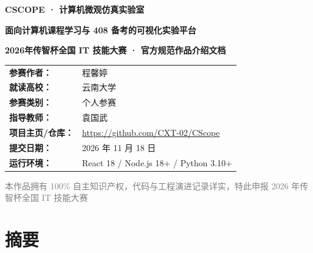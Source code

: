 \documentclass[UTF8,a4paper,11pt]{ctexart}
\begin{document}
\begin{titlepage}
    \centering
    \vspace*{1.5cm}
    
    {\Huge \bfseries CSCOPE · 计算机微观仿真实验室 \par}
    \vspace{0.6cm}
    {\LARGE \bfseries 面向计算机课程学习与 408 备考的可视化实验平台 \par}
    
    \vspace{1.5cm}
    {\Large \textbf{2026年传智杯全国 IT 技能大赛 · 官方规范作品介绍文档} \par}
    \vspace{0.4cm}
    
    \vspace{2.5cm}
    \begin{minipage}{0.75\textwidth}
        \large
        \renewcommand{\arraystretch}{1.6}
        \begin{tabular}{p{3.5cm}l}
            \textbf{参赛作者：} & 程馨婷 \\
            \textbf{就读高校：} & 云南大学 \\
            \textbf{参赛类别：} & 个人参赛 \\
            \textbf{指导教师：} & 袁国武 \\
            \textbf{项目主页/仓库：} & \url{https://github.com/CXT-02/CScope} \\
            \textbf{提交日期：} & 2026 年 11 月 18 日 \\
            \textbf{运行环境：} & React 18 / Node.js 18+ / Python 3.10+ \\
        \end{tabular}
    \end{minipage}
    
    \vfill
    {\small \textcolor{gray}{本作品拥有 100\% 自主知识产权，代码与工程演进记录详实，特此申报 2026 年传智杯全国 IT 技能大赛} \par}
    \vspace*{1cm}
\end{titlepage}

\newpage
{}
\tableofcontents
\newpage
{}
\setcounter{page}{1}

\section*{摘要}
\end{document}
